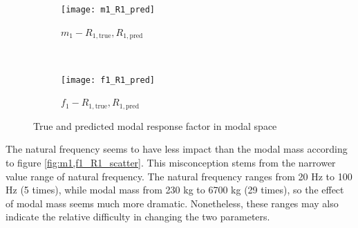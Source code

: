 \begin{figure}[H]
\begin{subfigure}[b]{.49\textwidth}
  \centering
  \texttt{[image: m1\_R1\_pred]}
  \caption{$m_1-R_{1,\text{true}},R_{1,\text{pred}}$}
\end{subfigure}
~
\begin{subfigure}[b]{.49\textwidth}
  \centering
  \texttt{[image: f1\_R1\_pred]}
  \caption{$f_1-R_{1,\text{true}},R_{1,\text{pred}}$}
\end{subfigure}

\caption{True and predicted modal response factor in modal space}
\label{fig:m1,f1_R1_pred}
\end{figure}

The natural frequency seems to have less impact than the modal mass according to figure \ref{fig:m1,f1_R1_scatter}. This misconception stems from the narrower value range of natural frequency. The natural frequency ranges from 20 Hz to 100 Hz (5 times), while modal mass from 230 kg to 6700 kg (29 times), so the effect of modal mass seems much more dramatic. Nonetheless, these ranges may also indicate the relative difficulty in changing the two parameters.